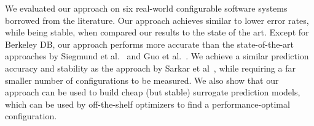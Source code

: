 \documentclass{newsig}
\newcommand{\tion}[1]{\S\ref{sect:#1}}
\begin{document}
We evaluated our approach on six real-world configurable software systems borrowed from the literature. Our approach achieves similar to lower error rates, while being stable, when compared our results to the state of the art. 
Except for Berkeley DB, our approach performs more accurate than the state-of-the-art approaches by Siegmund et al.~\cite{siegmund2012predicting} and Guo et al.~\cite{guo2013variability}. We achieve a similar prediction accuracy and stability as the approach by Sarkar et al~\cite{sarkar2015cost}, while requiring a far smaller number of configurations to be measured. We also show that our approach can be used to build cheap (but stable) surrogate prediction models, which can be used by off-the-shelf optimizers to find a performance-optimal configuration. 




 
 


\balance
  
\end{document}
